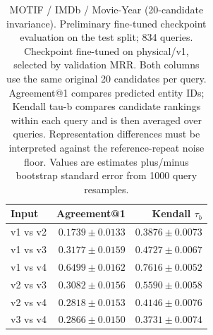 \begin{table}[t]
\centering
\small
\begin{tabular}{lrr}
\toprule
Input & Agreement@1 & Kendall $\tau_b$ \\
\midrule
v1 vs v2 & $0.1739 \pm 0.0133$ & $0.3876 \pm 0.0073$ \\
v1 vs v3 & $0.3177 \pm 0.0159$ & $0.4727 \pm 0.0067$ \\
v1 vs v4 & $0.6499 \pm 0.0162$ & $0.7616 \pm 0.0052$ \\
v2 vs v3 & $0.3082 \pm 0.0156$ & $0.5590 \pm 0.0058$ \\
v2 vs v4 & $0.2818 \pm 0.0153$ & $0.4146 \pm 0.0076$ \\
v3 vs v4 & $0.2866 \pm 0.0150$ & $0.3731 \pm 0.0074$ \\
\bottomrule
\end{tabular}
\caption{MOTIF / IMDb / Movie-Year (20-candidate invariance). Preliminary fine-tuned checkpoint evaluation on the test split; 834 queries. Checkpoint fine-tuned on physical/v1, selected by validation MRR. Both columns use the same original 20 candidates per query. Agreement@1 compares predicted entity IDs; Kendall tau-b compares candidate rankings within each query and is then averaged over queries. Representation differences must be interpreted against the reference-repeat noise floor. Values are estimates plus/minus bootstrap standard error from 1000 query resamples.}
\label{tab:motif-movie_year-invariance}
\end{table}
